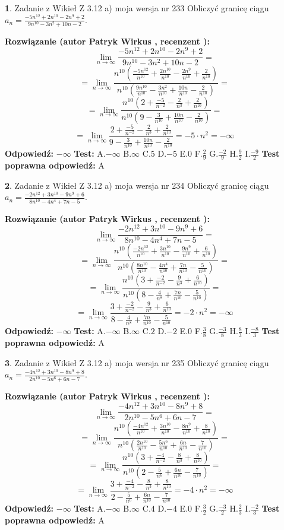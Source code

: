 \documentclass[12pt, a4paper]{article}
\theoremstyle{definition} %
\newtheorem{zad}{}
\newcommand{\zadStart}[1]{\begin{zad}#1\newline}
\newcommand{\zadStop}{\end{zad}}
\newcommand{\rozwStart}[2]{\noindent \textbf{Rozwiązanie (autor #1 , recenzent #2): }\newline}
\newcommand{\rozwStop}{\newline}
\newcommand{\odpStart}{\noindent \textbf{Odpowiedź:}\newline}
\newcommand{\odpStop}{\newline}
\newcommand{\testStart}{\noindent \textbf{Test:}\newline}
\newcommand{\testStop}{\newline}
\newcommand{\kluczStart}{\noindent \textbf{Test poprawna odpowiedź:}\newline}
\newcommand{\kluczStop}{\newline}
\begin{document}
\zadStart{Zadanie z Wikieł Z 3.12 a) moja wersja nr 233}
Obliczyć granicę ciągu $a_{n}=\frac{-5n^{12}+2n^{10}-2n^{9}+2}{9n^{10}-3n^{2}+10n-2}$.
\zadStop
\rozwStart{Patryk Wirkus}{}
$$\lim\limits_{n\to\infty}\frac{-5n^{12}+2n^{10}-2n^{9}+2}{9n^{10}-3n^{2}+10n-2}=$$
$$=\lim\limits_{n\to\infty}\frac{n^{10}\left(\frac{-5n^{12}}{n^{10}}+\frac{2n^{10}}{n^{10}}-\frac{2n^{9}}{n^{10}}+\frac{2}{n^{10}}\right)}{n^{10}\left(\frac{9n^{10}}{n^{10}}-\frac{3n^{2}}{n^{10}}+\frac{10n}{n^{10}}-\frac{2}{n^{10}}\right)}=$$
$$=\lim\limits_{n\to\infty}\frac{n^{10}\left(2+\frac{-5}{n^{-2}}-\frac{2}{n^{3}}+\frac{2}{n^{10}}\right)}
{n^{10}\left(9-\frac{3}{n^{10}}+\frac{10n}{n^{10}}-\frac{2}{n^{10}}\right)}=$$
$$=\lim\limits_{n\to\infty}\frac{2+\frac{-5}{n^{-2}}-\frac{2}{n^{3}}+\frac{2}{n^{10}}}{9-\frac{3}{n^{10}}+\frac{10n}{n^{10}}-\frac{2}{n^{10}}}=-5\cdot n^{2} = -\infty$$
\rozwStop
\odpStart
$-\infty$
\odpStop
\testStart
A.$-\infty$
B.$\infty$
C.$5$
D.$-5$
E.$0$
F.$\frac{2}{9}$
G.$\frac{-2}{9}$
H.$\frac{9}{2}$
I.$\frac{-9}{2}$
\testStop
\kluczStart
A
\kluczStop



\zadStart{Zadanie z Wikieł Z 3.12 a) moja wersja nr 234}
Obliczyć granicę ciągu $a_{n}=\frac{-2n^{12}+3n^{10}-9n^{9}+6}{8n^{10}-4n^{4}+7n-5}$.
\zadStop
\rozwStart{Patryk Wirkus}{}
$$\lim\limits_{n\to\infty}\frac{-2n^{12}+3n^{10}-9n^{9}+6}{8n^{10}-4n^{4}+7n-5}=$$
$$=\lim\limits_{n\to\infty}\frac{n^{10}\left(\frac{-2n^{12}}{n^{10}}+\frac{3n^{10}}{n^{10}}-\frac{9n^{9}}{n^{10}}+\frac{6}{n^{10}}\right)}{n^{10}\left(\frac{8n^{10}}{n^{10}}-\frac{4n^{4}}{n^{10}}+\frac{7n}{n^{10}}-\frac{5}{n^{10}}\right)}=$$
$$=\lim\limits_{n\to\infty}\frac{n^{10}\left(3+\frac{-2}{n^{-2}}-\frac{9}{n^{3}}+\frac{6}{n^{10}}\right)}
{n^{10}\left(8-\frac{4}{n^{8}}+\frac{7n}{n^{10}}-\frac{5}{n^{10}}\right)}=$$
$$=\lim\limits_{n\to\infty}\frac{3+\frac{-2}{n^{-2}}-\frac{9}{n^{3}}+\frac{6}{n^{10}}}{8-\frac{4}{n^{8}}+\frac{7n}{n^{10}}-\frac{5}{n^{10}}}=-2\cdot n^{2} = -\infty$$
\rozwStop
\odpStart
$-\infty$
\odpStop
\testStart
A.$-\infty$
B.$\infty$
C.$2$
D.$-2$
E.$0$
F.$\frac{3}{8}$
G.$\frac{-3}{8}$
H.$\frac{8}{3}$
I.$\frac{-8}{3}$
\testStop
\kluczStart
A
\kluczStop



\zadStart{Zadanie z Wikieł Z 3.12 a) moja wersja nr 235}
Obliczyć granicę ciągu $a_{n}=\frac{-4n^{12}+3n^{10}-8n^{9}+8}{2n^{10}-5n^{6}+6n-7}$.
\zadStop
\rozwStart{Patryk Wirkus}{}
$$\lim\limits_{n\to\infty}\frac{-4n^{12}+3n^{10}-8n^{9}+8}{2n^{10}-5n^{6}+6n-7}=$$
$$=\lim\limits_{n\to\infty}\frac{n^{10}\left(\frac{-4n^{12}}{n^{10}}+\frac{3n^{10}}{n^{10}}-\frac{8n^{9}}{n^{10}}+\frac{8}{n^{10}}\right)}{n^{10}\left(\frac{2n^{10}}{n^{10}}-\frac{5n^{6}}{n^{10}}+\frac{6n}{n^{10}}-\frac{7}{n^{10}}\right)}=$$
$$=\lim\limits_{n\to\infty}\frac{n^{10}\left(3+\frac{-4}{n^{-2}}-\frac{8}{n^{3}}+\frac{8}{n^{10}}\right)}
{n^{10}\left(2-\frac{5}{n^{6}}+\frac{6n}{n^{10}}-\frac{7}{n^{10}}\right)}=$$
$$=\lim\limits_{n\to\infty}\frac{3+\frac{-4}{n^{-2}}-\frac{8}{n^{3}}+\frac{8}{n^{10}}}{2-\frac{5}{n^{6}}+\frac{6n}{n^{10}}-\frac{7}{n^{10}}}=-4\cdot n^{2} = -\infty$$
\rozwStop
\odpStart
$-\infty$
\odpStop
\testStart
A.$-\infty$
B.$\infty$
C.$4$
D.$-4$
E.$0$
F.$\frac{3}{2}$
G.$\frac{-3}{2}$
H.$\frac{2}{3}$
I.$\frac{-2}{3}$
\testStop
\kluczStart
A
\kluczStop
\end{document}
